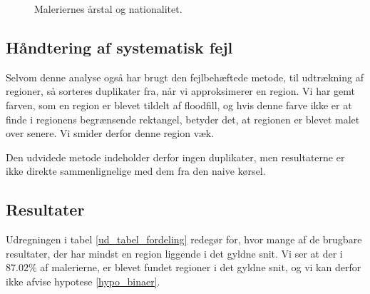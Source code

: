 {\begin{figure}[!h]
    \centering
    \hspace{1em}
    \caption[]{Maleriernes årstal og nationalitet.}
    \label{ud_year_nation}
\end{figure}

\subsection{Håndtering af systematisk fejl}
Selvom denne analyse også har brugt den fejlbehæftede metode, til
udtrækning af regioner, så sorteres duplikater fra, når vi approksimerer
en region. Vi har gemt farven, som en region er blevet tildelt af
floodfill, og hvis denne farve ikke er at finde i regionens begrænsende
rektangel, betyder det, at regionen er blevet malet over senere. Vi
smider derfor denne region væk.

Den udvidede metode indeholder derfor ingen duplikater, men resultaterne
er ikke direkte sammenlignelige med dem fra den naive kørsel.

\subsection{Resultater}
Udregningen i tabel \ref{ud_tabel_fordeling} redegør for, hvor mange af
de brugbare resultater, der har mindst en region liggende i det gyldne
snit. Vi ser at der i $87.02\%$ af malerierne, er blevet fundet regioner
i det gyldne snit, og vi kan derfor ikke afvise hypotese
\ref{hypo_binaer}.

}
